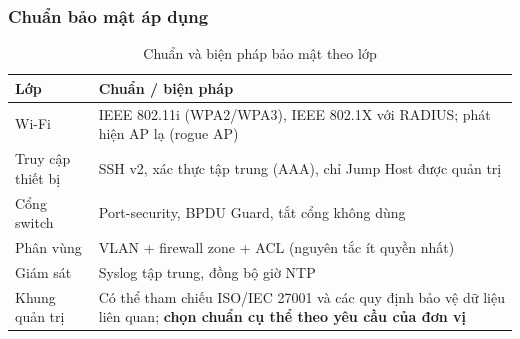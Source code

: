 \subsubsection{Chuẩn bảo mật áp dụng}
\begin{small}
\setlength{\tabcolsep}{4pt}
\begin{longtable}{|p{2.8cm}|p{11.0cm}|}
\caption{Chuẩn và biện pháp bảo mật theo lớp} \label{tab:security_standards} \\
\hline
\textbf{Lớp} & \textbf{Chuẩn / biện pháp} \\ \hline
\endhead
Wi-Fi & IEEE 802.11i (WPA2/WPA3), IEEE 802.1X với RADIUS; phát hiện AP lạ (rogue AP) \\ \hline
Truy cập thiết bị & SSH v2, xác thực tập trung (AAA), chỉ Jump Host được quản trị \\ \hline
Cổng switch & Port-security, BPDU Guard, tắt cổng không dùng \\ \hline
Phân vùng & VLAN + firewall zone + ACL (nguyên tắc ít quyền nhất) \\ \hline
Giám sát & Syslog tập trung, đồng bộ giờ NTP \\ \hline
Khung quản trị & Có thể tham chiếu ISO/IEC 27001 và các quy định bảo vệ dữ liệu liên quan; \textbf{chọn chuẩn cụ thể theo yêu cầu của đơn vị} \\ \hline
\end{longtable}
\end{small}


